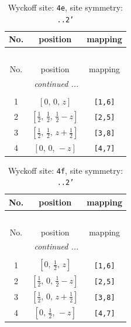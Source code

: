 \documentclass[fleqn,8pt]{jsarticle}
\begin{document}
\begin{longtable}{ccc}
\caption{Wyckoff site: {\tt 4e}, site symmetry: {\tt ..2'}}
 \\
 \hline \hline
No. & position & mapping \\ \hline \endfirsthead

\multicolumn{2}{l}{\tablename\ \thetable{}} \\
 \hline \hline
No. & position & mapping \\ \hline \endhead

 \hline \hline
\multicolumn{2}{r}{\footnotesize\it continued ...} \\ \endfoot

 \hline \hline
\multicolumn{2}{r}{} \\ \endlastfoot

1 & $\left[ 0,\, 0,\, z \right]$ & {\tt [1,6]} \\ \hline
2 & $\left[ \frac{1}{2},\, \frac{1}{2},\, \frac{1}{2} - z \right]$ & {\tt [2,5]} \\ \hline
3 & $\left[ \frac{1}{2},\, \frac{1}{2},\, z + \frac{1}{2} \right]$ & {\tt [3,8]} \\ \hline
4 & $\left[ 0,\, 0,\, - z \right]$ & {\tt [4,7]} \\
\end{longtable}
\renewcommand{\arraystretch}{1.2}
\begin{longtable}{ccc}
\caption{Wyckoff site: {\tt 4f}, site symmetry: {\tt ..2'}}
 \\
 \hline \hline
No. & position & mapping \\ \hline \endfirsthead

\multicolumn{2}{l}{\tablename\ \thetable{}} \\
 \hline \hline
No. & position & mapping \\ \hline \endhead

 \hline \hline
\multicolumn{2}{r}{\footnotesize\it continued ...} \\ \endfoot

 \hline \hline
\multicolumn{2}{r}{} \\ \endlastfoot

1 & $\left[ 0,\, \frac{1}{2},\, z \right]$ & {\tt [1,6]} \\ \hline
2 & $\left[ \frac{1}{2},\, 0,\, \frac{1}{2} - z \right]$ & {\tt [2,5]} \\ \hline
3 & $\left[ \frac{1}{2},\, 0,\, z + \frac{1}{2} \right]$ & {\tt [3,8]} \\ \hline
4 & $\left[ 0,\, \frac{1}{2},\, - z \right]$ & {\tt [4,7]} \\
\end{longtable}
\end{document}
